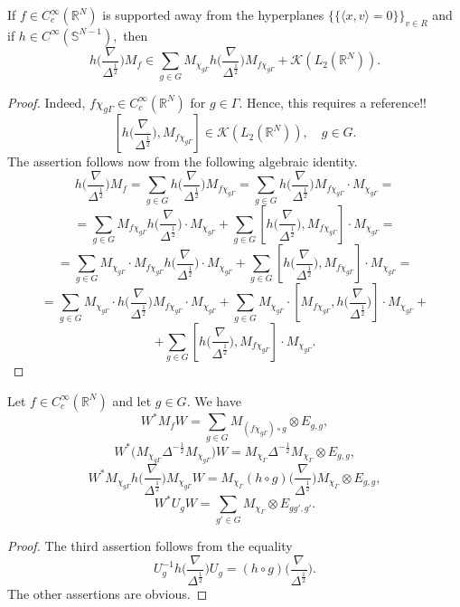 \documentclass{amsart}
\begin{document}
\begin{lemma}\label{second asymptotics lemma} If $f\in C^{\infty}_c(\mathbb{R}^N)$ is supported away from the hyperplanes $\{\{\langle x,v\rangle=0\}\}_{v\in R}$ and if
$h\in C^{\infty}(\mathbb{S}^{N-1}),$ then
$$h\big(\frac{\nabla}{\Delta^{\frac12}}\big)M_f
\in\sum_{g\in G}M_{\chi_{g\Gamma}}h\big(\frac{\nabla}{\Delta^{\frac12}}\big)M_{f\chi_{g\Gamma}}+\mathcal{K}(L_2(\mathbb{R}^N)).$$
\end{lemma}
\begin{proof} Indeed, $f\chi_{g\Gamma}\in C^{\infty}_c(\mathbb{R}^N)$ for $g\in\Gamma.$ Hence, {\color{red} this requires a reference!!}
$$[h\big(\frac{\nabla}{\Delta^{\frac12}}\big),M_{f\chi_{g\Gamma}}]\in \mathcal{K}(L_2(\mathbb{R}^N)),\quad g\in G.$$
The assertion follows now from the following algebraic identity.
$$h\big(\frac{\nabla}{\Delta^{\frac12}}\big)M_f=\sum_{g\in G}h\big(\frac{\nabla}{\Delta^{\frac12}}\big)M_{f\chi_{g\Gamma}}=\sum_{g\in G}h\big(\frac{\nabla}{\Delta^{\frac12}}\big)M_{f\chi_{g\Gamma}}\cdot M_{\chi_{g\Gamma}}=$$
$$=\sum_{g\in G}M_{f\chi_{g\Gamma}}h\big(\frac{\nabla}{\Delta^{\frac12}}\big)\cdot M_{\chi_{g\Gamma}}+\sum_{g\in G}[h\big(\frac{\nabla}{\Delta^{\frac12}}\big),M_{f\chi_{g\Gamma}}]\cdot M_{\chi_{g\Gamma}}=$$
$$=\sum_{g\in G}M_{\chi_{g\Gamma}}\cdot M_{f\chi_{g\Gamma}}h\big(\frac{\nabla}{\Delta^{\frac12}}\big)\cdot M_{\chi_{g\Gamma}}+\sum_{g\in G}[h\big(\frac{\nabla}{\Delta^{\frac12}}\big),M_{f\chi_{g\Gamma}}]\cdot M_{\chi_{g\Gamma}}=$$
$$=\sum_{g\in G}M_{\chi_{g\Gamma}}\cdot h\big(\frac{\nabla}{\Delta^{\frac12}}\big)M_{f\chi_{g\Gamma}}\cdot M_{\chi_{g\Gamma}}+\sum_{g\in G}M_{\chi_{g\Gamma}}\cdot [M_{f\chi_{g\Gamma}},h\big(\frac{\nabla}{\Delta^{\frac12}}\big)]\cdot M_{\chi_{g\Gamma}}+$$
$$+\sum_{g\in G}[h\big(\frac{\nabla}{\Delta^{\frac12}}\big),M_{f\chi_{g\Gamma}}]\cdot M_{\chi_{g\Gamma}}.$$
\end{proof}

\begin{lemma}\label{third asymptotics lemma} Let $f\in C^{\infty}_c(\mathbb{R}^N)$ and let $g\in G.$  We have
$$W^{\ast}M_fW=\sum_{g\in G}M_{(f\chi_{g\Gamma})\circ g}\otimes E_{g,g},$$
$$W^{\ast}\big(M_{\chi_{g\Gamma}}\Delta^{-\frac12}M_{\chi_{g\Gamma}}\big)W=M_{\chi_{\Gamma}}\Delta^{-\frac12}M_{\chi_{\Gamma}}\otimes E_{g,g},$$
$$W^{\ast}M_{\chi_{g\Gamma}}h\big(\frac{\nabla}{\Delta^{\frac12}}\big)M_{\chi_{g\Gamma}}W=M_{\chi_{\Gamma}}(h\circ g)\big(\frac{\nabla}{\Delta^{\frac12}}\big)M_{\chi_{\Gamma}}\otimes E_{g,g},$$
$$W^{\ast}U_gW=\sum_{g'\in G}M_{\chi_{\Gamma}}\otimes E_{gg',g'}.$$
\end{lemma}
\begin{proof} The third assertion follows from the equality
$$U_g^{-1}h\big(\frac{\nabla}{\Delta^{\frac12}}\big)U_g=(h\circ g)\big(\frac{\nabla}{\Delta^{\frac12}}\big).$$
The other assertions are obvious.
\end{proof}
\end{document}
